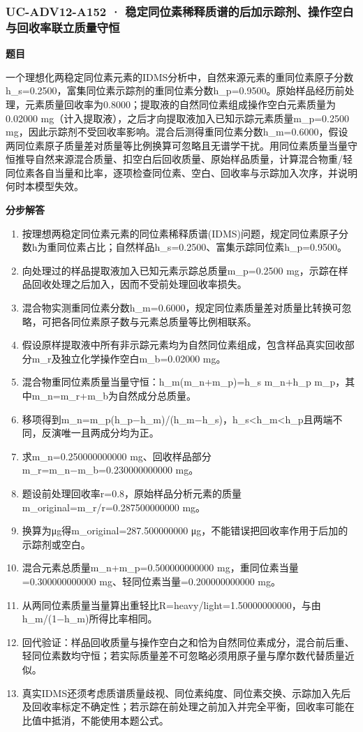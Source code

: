 \documentclass[UTF8,11pt,a4paper]{ctexart}
\begin{document}
\subsubsection*{UC-ADV12-A152 · 稳定同位素稀释质谱的后加示踪剂、操作空白与回收率联立质量守恒}
\noindent\textbf{题目}\par
一个理想化两稳定同位素元素的IDMS分析中，自然来源元素的重同位素原子分数h\_s=0.2500，富集同位素示踪剂的重同位素分数h\_p=0.9500。原始样品经历前处理，元素质量回收率为0.8000；提取液的自然同位素组成操作空白元素质量为0.02000 mg（计入提取液），之后才向提取液加入已知示踪元素质量m\_p=0.2500 mg，因此示踪剂不受回收率影响。混合后测得重同位素分数h\_m=0.6000，假设两同位素原子质量差对质量等比例换算可忽略且无谱学干扰。用同位素质量当量守恒推导自然来源混合质量、扣空白后回收质量、原始样品质量，计算混合物重/轻同位素各自当量和比率，逐项检查同位素、空白、回收率与示踪加入次序，并说明何时本模型失效。\par
\medskip\noindent\textbf{分步解答}
\begin{enumerate}
\item 按理想两稳定同位素元素的同位素稀释质谱(IDMS)问题，规定同位素原子分数h为重同位素占比；自然样品h\_s=0.2500、富集示踪同位素h\_p=0.9500。
\item 向处理过的样品提取液加入已知元素示踪总质量m\_p=0.2500 mg，示踪在样品回收处理之后加入，因而不受前处理回收率损失。
\item 混合物实测重同位素分数h\_m=0.6000，规定同位素质量差对质量比转换可忽略，可把各同位素原子数与元素总质量等比例相联系。
\item 假设原样提取液中所有非示踪元素均为自然同位素组成，包含样品真实回收部分m\_r及独立化学操作空白m\_b=0.02000 mg。
\item 混合物重同位素质量当量守恒：h\_m(m\_n+m\_p)=h\_s m\_n+h\_p m\_p，其中m\_n=m\_r+m\_b为自然成分总质量。
\item 移项得到m\_n=m\_p(h\_p−h\_m)/(h\_m−h\_s)，h\_s<h\_m<h\_p且两端不同，反演唯一且两成分均为正。
\item 求m\_n=0.250000000000 mg、回收样品部分m\_r=m\_n−m\_b=0.230000000000 mg。
\item 题设前处理回收率r=0.8，原始样品分析元素的质量m\_original=m\_r/r=0.287500000000 mg。
\item 换算为μg得m\_original=287.500000000 μg，不能错误把回收率作用于后加的示踪剂或空白。
\item 混合元素总质量m\_n+m\_p=0.500000000000 mg，重同位素当量=0.300000000000 mg、轻同位素当量=0.200000000000 mg。
\item 从两同位素质量当量算出重轻比R=heavy/light=1.50000000000，与由h\_m/(1−h\_m)所得比率相同。
\item 回代验证：样品回收质量与操作空白之和恰为自然同位素成分，混合前后重、轻同位素数均守恒；若实际质量差不可忽略必须用原子量与摩尔数代替质量近似。
\item 真实IDMS还须考虑质谱质量歧视、同位素纯度、同位素交换、示踪加入先后及回收率标定不确定性；若示踪在前处理之前加入并完全平衡，回收率可能在比值中抵消，不能使用本题公式。
\end{enumerate}
\end{document}
